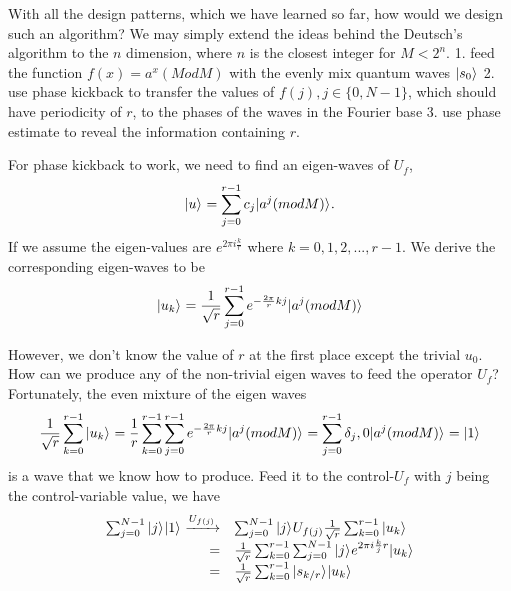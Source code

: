 \documentclass[oneside, letter, 12pt]{book}
\begin{document}
With all the design patterns, which we have learned so far, how would we design such an algorithm? We may simply extend the ideas behind the Deutsch's algorithm to the $n$ dimension, where $n$ is the closest integer for $M < 2^n$.
1. feed the function $f(x) = a^x (Mod M)$ with the evenly mix quantum waves $\vert {s_0} \rangle_{}$
2. use phase kickback to transfer the values of $f(j), j\in \{0,N-1\}$, which should have periodicity of $r$, to the phases of the waves in the Fourier base
3. use phase estimate to reveal the information containing $r$.

For phase kickback to work, we need to find an eigen-waves of $U_f$,
\begin{equation}\label{keta_u}
    \vert {u} \rangle_{} = \sum^{r-1}_{j=0} c_j \vert {a^j (mod M)} \rangle_{}.
\end{equation}
If we assume the eigen-values are $e^{2\pi i \frac k r}$ where $k=0, 1, 2, ..., r-1$. We derive the corresponding eigen-waves to be
\begin{equation}\label{keta_uk}
    \vert {u_k} \rangle_{} = \frac 1 {\sqrt{r}} \sum^{r-1}_{j=0} e^{-{\frac {2\pi} r} kj} \vert {a^j (mod M)} \rangle_{}
\end{equation}

However, we don't know the value of $r$ at the first place except the trivial $u_0$. How can we produce any of the non-trivial eigen waves to feed the operator $U_f$? Fortunately, the even mixture of the eigen waves
\begin{equation}\label{sum_u}
    \frac 1 {\sqrt{r}} \sum^{r-1}_{k=0}\vert {u_k} \rangle_{} = \frac 1 r \sum^{r-1}_{k=0} \sum^{r-1}_{j=0} e^{-{\frac {2\pi} r} kj} \vert {a^j (mod M)} \rangle_{} = \sum^{r-1}_{j=0} \delta_j,0 \vert {a^j (mod M)} \rangle_{} = \vert {1} \rangle_{}
\end{equation}
is a wave that we know how to produce. Feed it to the control-$U_f$ with $j$ being the control-variable value, we have
\begin{equation}\label{ctrl_u}
\begin{array}{rl}
 \sum^{N-1}_{j=0} \vert {j} \rangle_{} \vert {1} \rangle_{} \xrightarrow{U_{f(j)}} & \sum^{N-1}_{j=0} \vert {j} \rangle_{} U_{f(j)} \frac 1 {\sqrt{r}} \sum^{r-1}_{k=0}\vert {u_k} \rangle_{}\\
    = & \frac 1 {\sqrt{r}} \sum^{r-1}_{k=0} \sum^{N-1}_{j=0} \vert {j} \rangle_{} e^{2\pi i \frac kj r} \vert {u_k} \rangle_{}\\
    = & \frac 1 {\sqrt{r}} \sum^{r-1}_{k=0} \vert {s_{k/r}} \rangle_{} \vert {u_k} \rangle_{}
\end{array}
\end{equation}
\end{document}
